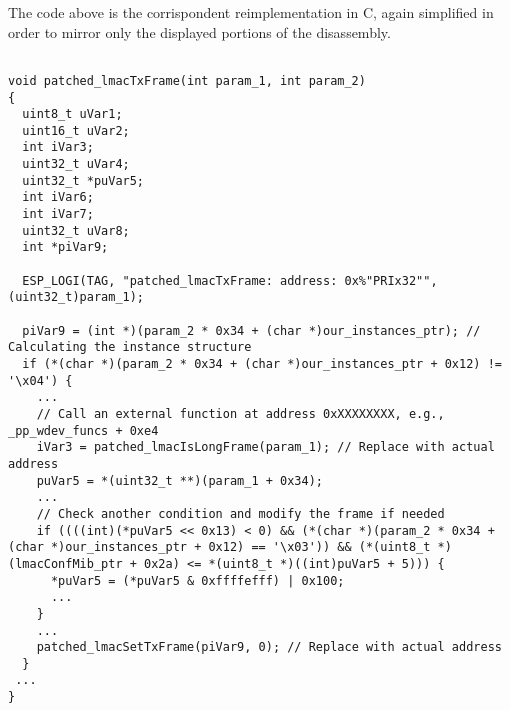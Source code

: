 The code above is the corrispondent reimplementation in C, again simplified in
order to mirror only the displayed portions of the disassembly.
\begin{lstlisting}

void patched_lmacTxFrame(int param_1, int param_2)
{
  uint8_t uVar1;
  uint16_t uVar2;
  int iVar3;
  uint32_t uVar4; 
  uint32_t *puVar5;
  int iVar6;
  int iVar7;
  uint32_t uVar8;
  int *piVar9;

  ESP_LOGI(TAG, "patched_lmacTxFrame: address: 0x%"PRIx32"", (uint32_t)param_1);

  piVar9 = (int *)(param_2 * 0x34 + (char *)our_instances_ptr); // Calculating the instance structure
  if (*(char *)(param_2 * 0x34 + (char *)our_instances_ptr + 0x12) != '\x04') {
    ...
    // Call an external function at address 0xXXXXXXXX, e.g., _pp_wdev_funcs + 0xe4
    iVar3 = patched_lmacIsLongFrame(param_1); // Replace with actual address
    puVar5 = *(uint32_t **)(param_1 + 0x34);
    ...
    // Check another condition and modify the frame if needed
    if ((((int)(*puVar5 << 0x13) < 0) && (*(char *)(param_2 * 0x34 + (char *)our_instances_ptr + 0x12) == '\x03')) && (*(uint8_t *)(lmacConfMib_ptr + 0x2a) <= *(uint8_t *)((int)puVar5 + 5))) {
      *puVar5 = (*puVar5 & 0xffffefff) | 0x100;
      ...
    }
    ...
    patched_lmacSetTxFrame(piVar9, 0); // Replace with actual address
  }
 ...
}
\end{lstlisting}


